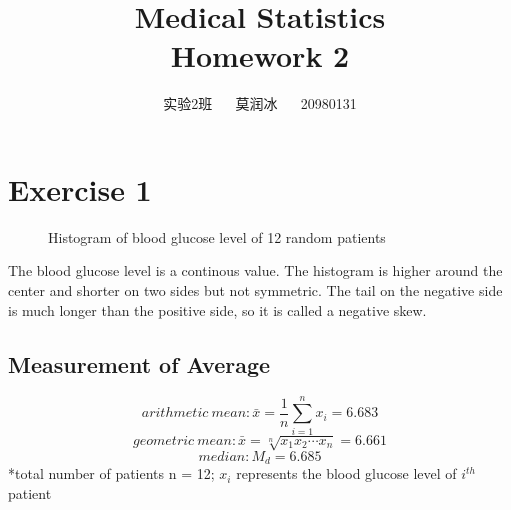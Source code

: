 \documentclass[11pt,a4paper,onside,UTF8]{article}
\title{\blue Medical Statistics \\
\blueb Homework 2}
\author{实验2班 ~~ 莫润冰 ~~ 20980131}
\date{}
\begin{document}
\maketitle

\renewcommand{\thefootnote}{\fnsymbol{footnote}}

\section{Exercise 1}

\begin{figure}[H]
	\centering
	\caption{Histogram of blood glucose level of 12 random patients}
\end{figure}
The blood glucose level is a continous value. The histogram is higher around the center and shorter on two sides but not symmetric.
The tail on the negative side is much longer than the positive side, so it is called a negative skew. 

\subsection{Measurement of Average}

\begin{equation}
	arithmetic \ mean: \bar{x} = \frac{1}{n}\sum_{i = 1}^{n} x_i = 6.683
\end{equation}
\begin{equation}
	geometric \ mean: \bar{x}= \sqrt[n]{x_1 x_2 \cdots x_n} = 6.661
\end{equation}
\begin{equation}
	median: M_d = 6.685
\end{equation}
*total number of patients n = 12; $x_i$ represents the blood glucose level of $i^{th}$ patient
\\ \hspace*{\fill} \\
\end{document}

